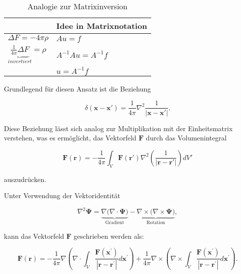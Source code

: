 \begin{table}
\centering
\begin{tabular}{l|l}
  & Idee in Matrixnotation \\
\hline
$\Delta F = -4 \pi \rho$  & $Au = f$ \\
$\underbrace{\frac{1}{4 \pi} \Delta F}_{invertiert} = \rho$ & $A^{-1}Au = A^{-1}f$  \\
 & $u = A^{-1}f$  \\
 \hline
\end{tabular}
\caption{Analogie zur Matrixinversion}
\label{tab:helmholtz_matrix_analogie}
\end{table}

\noindent Grundlegend für diesen Ansatz ist die Beziehung

\begin{equation}
\delta (\mathbf{x} - \mathbf{x'}) = \frac{1}{4 \pi} \nabla^2 \frac{1}{|\mathbf{x} - \mathbf{x'}|}.
\label{helmholtz:dirac}
\end{equation}

\noindent Diese Beziehung lässt sich analog zur Multiplikation mit der Einheitsmatrix verstehen, was es ermöglicht, das Vektorfeld $\mathbf{F}$ durch das Volumenintegral

\begin{equation}
\mathbf{F}(\mathbf{r}) = -\frac{1}{4\pi} \int_V \mathbf{F}(\mathbf{r}') \nabla^2 \left( \frac{1}{|\mathbf{r} - \mathbf{r}'|} \right) dV'
\end{equation}

\noindent auszudrücken.

\noindent Unter Verwendung der Vektoridentität

\begin{equation}
\nabla^2 \mathbf{\Psi}= \underbrace{\nabla \Big( \nabla \cdot \mathbf{\Psi} \Big)}_{\text{Gradient}} -\underbrace{\nabla \times \Big(\nabla \times \mathbf{\Psi} \Big)}_{\text{Rotation}},
\end{equation}

\noindent kann das Vektorfeld $\mathbf{F}$ geschrieben werden als:

\begin{equation}
\mathbf{F}(\mathbf{r}) = - \frac{1}{4 \pi} \nabla ( \nabla \cdot \int_V \frac{\mathbf{F}(\mathbf{x}^{\prime})}{|\mathbf{r} - \mathbf{r}^{\prime}|} d\mathbf{x}^{\prime} ) + \frac{1}{4 \pi} \nabla \times ( \nabla \times \int_V \frac{\mathbf{F}(\mathbf{x}^{\prime})}{|\mathbf{r} - \mathbf{r}^{\prime}|} d\mathbf{x}^{\prime} ).
\end{equation}

